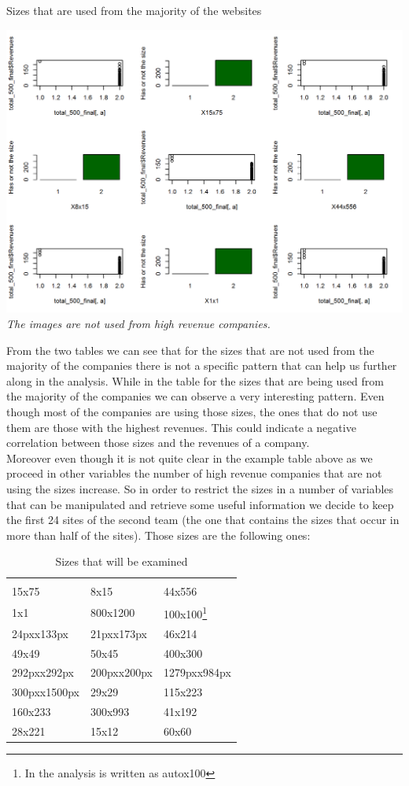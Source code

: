 \documentclass{article}
\begin{document}
\begin{table}[H]
\centering
\caption{Sizes that are used from the majority of the websites}
\begin{center}
\includegraphics[scale=0.5]{../R/photos/65_size_yes.png}    \\
\textit{The images are not used from high revenue companies.}
\end{center}
\end{table}
From the two tables we can see that for the sizes that are not used from the majority of the companies there is not a specific pattern that can help us further along in the analysis. While in the table for the sizes that are being used from the majority of the companies we can observe a very interesting pattern. Even though most of the companies are using those sizes, the ones that do not use them are those with the highest revenues. This could indicate a negative correlation between those sizes and the revenues of a company.\\
Moreover even though it is not quite clear in the example table above as we proceed in other variables the number of high revenue companies that are not using the sizes increase. So in order to restrict the sizes in a number of variables that can be manipulated and retrieve some useful information we decide to keep the first 24 sites of the second team (the one that contains the sizes that occur in more than half of the sites). Those sizes are the following ones:
\begin{table}[H]
\centering
\caption{Sizes that will be examined}
\begin{tabular}{lll}
\hline
 \\
15x75 
& 8x15
& 44x556 
\\1x1
& 800x1200
& 100x100\footnote{In the analysis is written as autox100}
\\24pxx133px
& 21pxx173px
& 46x214
\\49x49
& 50x45
& 400x300
\\292pxx292px
& 200pxx200px
& 1279pxx984px
\\300pxx1500px
& 29x29
& 115x223
\\160x233
& 300x993
& 41x192
\\28x221
& 15x12
& 60x60
\\ \hline
\end{tabular}
\end{table}
 
\end{document}
